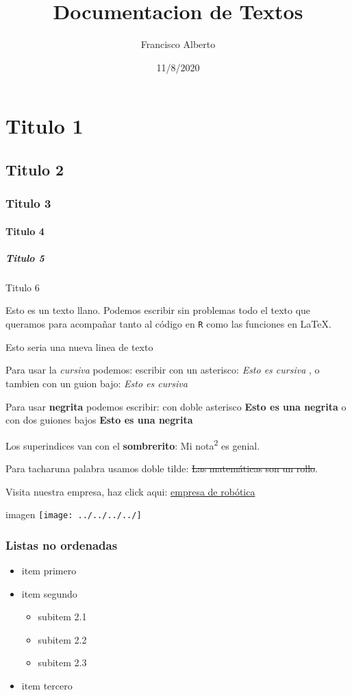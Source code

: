 \documentclass[
]{article}
\title{Documentacion de Textos}
\author{Francisco Alberto}
\date{11/8/2020}
\providecommand{\tightlist}{%
  \setlength{\itemsep}{0pt}\setlength{\parskip}{0pt}}
\begin{document}
\maketitle

\hypertarget{titulo-1}{%
\section{Titulo 1}\label{titulo-1}}

\hypertarget{titulo-2}{%
\subsection{Titulo 2}\label{titulo-2}}

\hypertarget{titulo-3}{%
\subsubsection{Titulo 3}\label{titulo-3}}

\hypertarget{titulo-4}{%
\paragraph{Titulo 4}\label{titulo-4}}

\hypertarget{titulo-5}{%
\subparagraph{Titulo 5}\label{titulo-5}}

Titulo 6

Esto es un texto llano. Podemos escribir sin problemas todo el texto que
queramos para acompañar tanto al código en \texttt{R} como las funciones
en \LaTeX.

Esto seria una nueva linea de texto

Para usar la \emph{cursiva} podemos: escribir con un asterisco:
\emph{Esto es cursiva} , o tambien con un guion bajo: \emph{Esto es
cursiva}

Para usar \textbf{negrita} podemos escribir: con doble asterisco
\textbf{Esto es una negrita} o con dos guiones bajos \textbf{Esto es una
negrita}

Los superindices van con el \textbf{sombrerito}: Mi
nota\textsuperscript{2} es genial.

Para tacharuna palabra usamos doble tilde: \sout{Las matemáticas son un
rollo}.

Visita nuestra empresa, haz click aqui:
\href{https:/www.empresaderobotica.com/}{empresa de robótica}

imagen \texttt{[image: ../../../../]}

\hypertarget{listas-no-ordenadas}{%
\subsubsection{Listas no ordenadas}\label{listas-no-ordenadas}}

\begin{itemize}
\tightlist
\item
  item primero
\item
  item segundo

  \begin{itemize}
  \tightlist
  \item
    subitem 2.1
  \item
    subitem 2.2
  \item
    subitem 2.3
  \end{itemize}
\item
  item tercero
\end{itemize}
\end{document}
